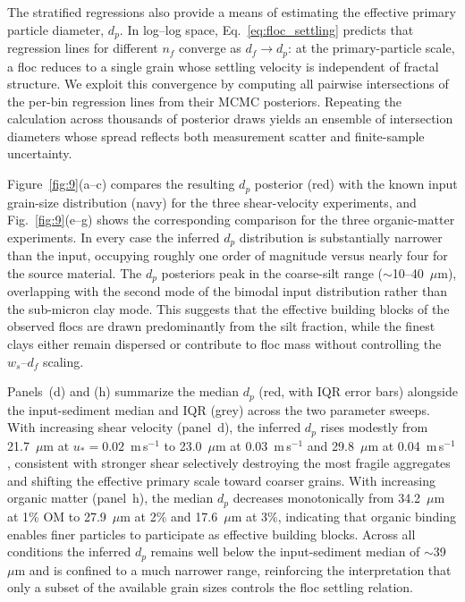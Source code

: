 The stratified regressions also provide a means of estimating the effective primary particle diameter, $d_p$. In log--log space, Eq.~\eqref{eq:floc_settling} predicts that regression lines for different $n_f$ converge as $d_f \to d_p$: at the primary-particle scale, a floc reduces to a single grain whose settling velocity is independent of fractal structure. We exploit this convergence by computing all pairwise intersections of the per-bin regression lines from their MCMC posteriors. Repeating the calculation across thousands of posterior draws yields an ensemble of intersection diameters whose spread reflects both measurement scatter and finite-sample uncertainty.

Figure~\ref{fig:9}(a--c) compares the resulting $d_p$ posterior (red) with the known input grain-size distribution (navy) for the three shear-velocity experiments, and Fig.~\ref{fig:9}(e--g) shows the corresponding comparison for the three organic-matter experiments. In every case the inferred $d_p$ distribution is substantially narrower than the input, occupying roughly one order of magnitude versus nearly four for the source material. The $d_p$ posteriors peak in the coarse-silt range ($\sim$10--40~$\mu$m), overlapping with the second mode of the bimodal input distribution rather than the sub-micron clay mode. This suggests that the effective building blocks of the observed flocs are drawn predominantly from the silt fraction, while the finest clays either remain dispersed or contribute to floc mass without controlling the $w_s$--$d_f$ scaling.

Panels~(d) and (h) summarize the median $d_p$ (red, with IQR error bars) alongside the input-sediment median and IQR (grey) across the two parameter sweeps. With increasing shear velocity (panel~d), the inferred $d_p$ rises modestly from 21.7~$\mu$m at $u_* = 0.02$~m\,s$^{-1}$ to 23.0~$\mu$m at 0.03~m\,s$^{-1}$ and 29.8~$\mu$m at 0.04~m\,s$^{-1}$, consistent with stronger shear selectively destroying the most fragile aggregates and shifting the effective primary scale toward coarser grains. With increasing organic matter (panel~h), the median $d_p$ decreases monotonically from 34.2~$\mu$m at 1\% OM to 27.9~$\mu$m at 2\% and 17.6~$\mu$m at 3\%, indicating that organic binding enables finer particles to participate as effective building blocks. Across all conditions the inferred $d_p$ remains well below the input-sediment median of $\sim$39~$\mu$m and is confined to a much narrower range, reinforcing the interpretation that only a subset of the available grain sizes controls the floc settling relation.

